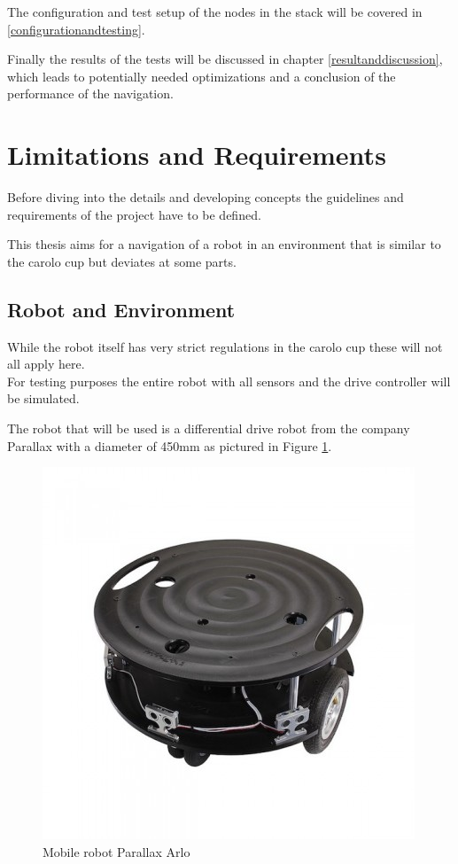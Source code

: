 The configuration and test setup of the nodes in the stack will be covered in \ref{configurationandtesting}.


Finally the results of the tests will be discussed in chapter \ref{resultanddiscussion}, which leads to potentially needed optimizations and a conclusion of the performance of the navigation.

\section{Limitations and Requirements}

Before diving into the details and developing concepts the guidelines and requirements of the project have to be defined.

This thesis aims for a navigation of a robot in an environment that is similar to the carolo cup but deviates at some parts.

\subsection{Robot and Environment}
While the robot itself has very strict regulations in the carolo cup these will not all apply here.\\

For testing purposes the entire robot with all sensors and the drive controller will be simulated.

The robot that will be used is a differential drive robot from the company Parallax with a diameter of 450mm as pictured in Figure \ref{arlore}.\\

\begin{figure}
	\centering
	\includegraphics[width=.7\textwidth]{arlo real}
	
	\caption{Mobile robot Parallax Arlo \cite{arloreal}}
	\label{arlore}
\end{figure}

